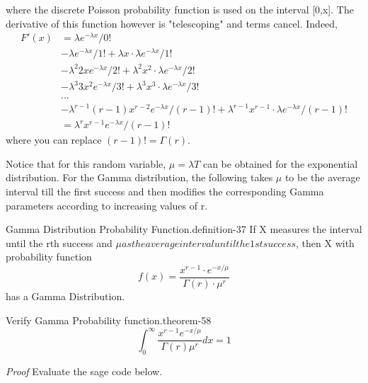 \documentclass[10pt,]{book}
\makeatletter
\renewcommand*{\proofname}{Proof}
\renewenvironment{proof}[1][\proofname]{\par
  \pushQED{\qed}%
  \normalfont \topsep6\p@\@plus6\p@\relax
  \trivlist
  \item\relax
    {\itshape
    #1\@addpunct{.}}\hspace\labelsep\ignorespaces
}{%
  \popQED\endtrivlist\@endpefalse
}
\numberwithin{equation}{section}
\makeatother
\begin{document}
where the discrete Poisson probability function is used on the interval [0,x]. The derivative of this function however is "telescoping" and terms cancel. Indeed,%
\begin{align*}
F'(x) & = \lambda e^{-\lambda x}/0!\\
& - \lambda e^{-\lambda x}/1! + \lambda x \cdot \lambda e^{-\lambda x}/1!\\
& - \lambda^2 2x e^{-\lambda x}/2! + \lambda^2 x^2 \cdot \lambda e^{-\lambda x}/2!\\
& - \lambda^3 3x^2 e^{-\lambda x}/3! + \lambda^3 x^3 \cdot \lambda e^{-\lambda x}/3!\\
& . . .\\
& - \lambda^{r-1} (r-1)x^{r-2} e^{-\lambda x}/(r-1)! + \lambda^{r-1} x^{r-1} \cdot \lambda e^{-\lambda x}/(r-1)!\\
& = \lambda^r x^{r-1} e^{-\lambda x}/(r-1)!
\end{align*}
where you can replace \((r-1)! = \Gamma(r)\).%
\par
\hypertarget{p-986}{}%
Notice that for this random variable, \(\mu = \lambda T\) can be obtained for the exponential distribution. For the Gamma distribution, the following takes \(\mu\) to be the average interval till the first success and then modifies the corresponding Gamma parameters according to increasing values of r.%
\par
\hypertarget{p-987}{}%
\begin{definition}{Gamma Distribution Probability Function.}{definition-37}%
\hypertarget{p-988}{}%
If X measures the interval until the rth success and \(\mu as the average interval until the 1st success\), then X with probability function%
\begin{equation*}
f(x) =  \frac{x^{r-1} \cdot e^{-x / \mu}}{\Gamma(r) \cdot \mu^r}
\end{equation*}
has a Gamma Distribution.%
\end{definition}
%
\par
\hypertarget{p-989}{}%
\begin{theorem}{Verify Gamma Probability function.}{}{theorem-58}%
\hypertarget{p-990}{}%
%
\begin{equation*}
\int_0^{\infty} \frac{x^{r-1} e^{-x/ \mu}}{\Gamma(r) \mu^r} dx = 1
\end{equation*}
%
\end{theorem}
\begin{proof}\hypertarget{proof-60}{}
\hypertarget{p-991}{}%
Evaluate the sage code below.%
\end{proof}
\end{document}
